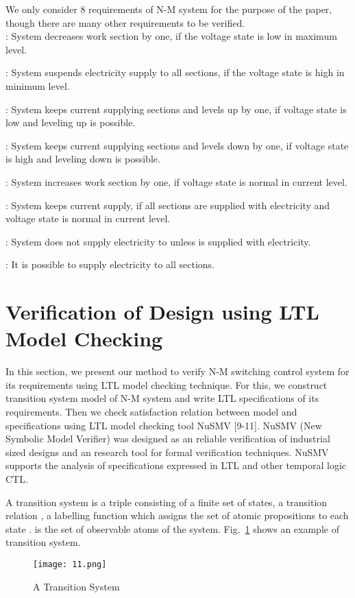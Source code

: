\documentclass[runningheads,a4paper]{llncs}
\begin{document}
We only consider 8 requirements of N-M system for the purpose of the paper, though there are many other requirements to be verified. \\

: System decreases work section by one, if the voltage state is low in maximum level.

: System suspends electricity supply to all sections, if the voltage state is high in minimum level. 

: System keeps current supplying sections and levels up by one, if voltage state is low and leveling up is possible. 

: System keeps current supplying sections and levels down by one, if voltage state is high and leveling down is possible.

: System increases work section by one, if voltage state is normal in current level.

: System keeps current supply, if all sections are supplied with electricity and voltage state is normal in current level. 

: System does not supply electricity to  unless  is supplied with electricity.

: It is possible to supply electricity to all sections. 

\section{Verification of Design using LTL Model Checking}

In this section, we present our method to verify N-M switching control system for its requirements using LTL model checking technique. For this, we construct transition system model of N-M system and write LTL specifications of its requirements. Then we check satisfaction relation between model and specifications using LTL model checking tool NuSMV [9-11]. NuSMV (New Symbolic Model Verifier) was designed as an reliable verification of industrial sized designs and an research tool for formal verification techniques. NuSMV supports the analysis of specifications expressed in LTL and other temporal logic CTL. 

A transition system  is a triple  consisting of a finite set  of states, a transition relation , a labelling function  which assigns the set of atomic propositions to each state .  is the set of observable atoms of the system. Fig.~\ref{fig1} shows an example of transition system.

\begin{figure}
\centering
\texttt{[image: 11.png]}
\caption{A Transition System}
\label{fig1}
\end{figure}
\end{document}
